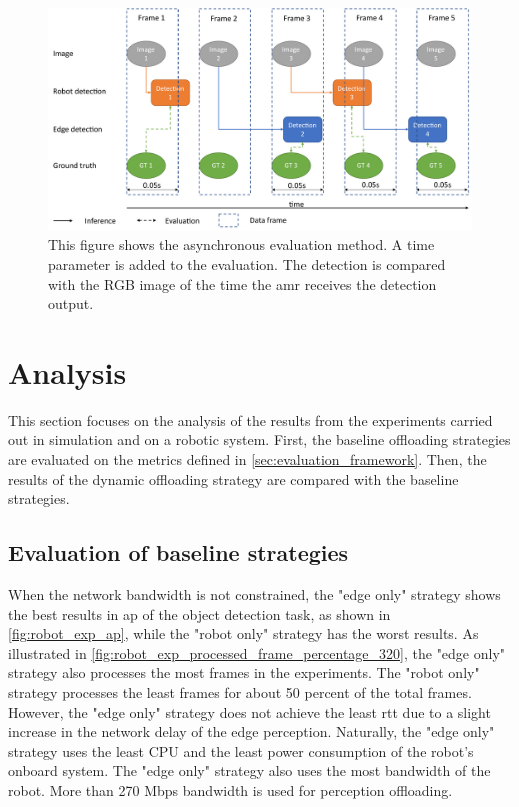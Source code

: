 \begin{figure}[htp]
    \centering
    \includegraphics[width=\linewidth]{figures/setup/async_eval.pdf}
    \caption[Asynchronous evaluation]{This figure shows the asynchronous evaluation method. A time parameter is added to the evaluation. The detection is compared with the RGB image of the time the \gls{amr} receives the detection output.}
    \label{fig:async_eval}
\end{figure}

\section{Analysis}\label{sec:analysis}

This section focuses on the analysis of the results from the experiments carried out in simulation and on a robotic system. First, the baseline offloading strategies are evaluated on the metrics defined in \cref{sec:evaluation_framework}. Then, the results of the dynamic offloading strategy are compared with the baseline strategies. 


\subsection{Evaluation of baseline strategies}

When the network bandwidth is not constrained, the "edge only" strategy shows the best results in \gls{ap} of the object detection task, as shown in \cref{fig:robot_exp_ap}, while the "robot only" strategy has the worst results. As illustrated in \cref{fig:robot_exp_processed_frame_percentage_320}, the "edge only" strategy also processes the most frames in the experiments. The "robot only" strategy processes the least frames for about 50 percent of the total frames. However, the "edge only" strategy does not achieve the least \gls{rtt} due to a slight increase in the network delay of the edge perception. Naturally, the "edge only" strategy uses the least CPU and the least power consumption of the robot's onboard system. The "edge only" strategy also uses the most bandwidth of the robot. More than 270 Mbps bandwidth is used for perception offloading. 

